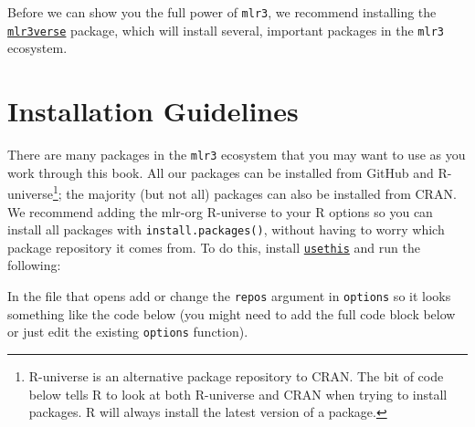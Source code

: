 Before we can show you the full power of \texttt{mlr3}, we recommend
installing the
\href{https://mlr3verse.mlr-org.com}{\texttt{mlr3verse}}
package, which will install several, important packages in the
\texttt{mlr3} ecosystem.

\begin{Shaded}
\begin{Highlighting}[]
\NormalTok{(}\NormalTok{)}
\end{Highlighting}
\end{Shaded}

\hypertarget{installguide}{%
\section{Installation Guidelines}\label{installguide}}

There are many packages in the \texttt{mlr3} ecosystem that you may want
to use as you work through this book. All our packages can be installed
from GitHub and R-universe\footnote{R-universe is an alternative package
  repository to CRAN. The bit of code below tells R to look at both
  R-universe and CRAN when trying to install packages. R will always
  install the latest version of a package.}; the majority (but not all)
packages can also be installed from CRAN. We recommend adding the
mlr-org R-universe to your R options so you can install all packages
with \texttt{install.packages()}, without having to worry which package
repository it comes from. To do this, install
\href{https://cran.r-project.org/package=usethis}{\texttt{usethis}} and
run the following:

\begin{Shaded}
\begin{Highlighting}[]
\SpecialCharTok{::}\NormalTok{()}
\end{Highlighting}
\end{Shaded}

In the file that opens add or change the \texttt{repos} argument in
\texttt{options} so it looks something like the code below (you might
need to add the full code block below or just edit the existing
\texttt{options} function).

\begin{Shaded}
\begin{Highlighting}[]
\NormalTok{(} \NormalTok{(}
   \NormalTok{,}
   
\NormalTok{))}
\end{Highlighting}
\end{Shaded}


